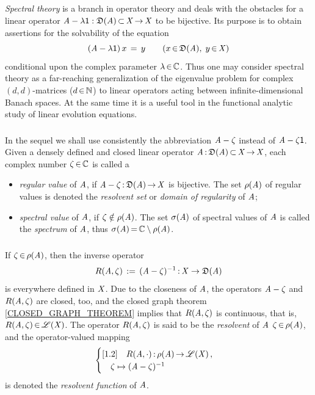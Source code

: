 \documentclass[11pt,twoside]{article}
\begin{document}
\subparagraph*{}
\textit{Spectral theory} is a branch in operator theory
and deals with the obstacles for a linear operator
$\mathit{A} - \lambda {\mathsf{1}}:\mathfrak{D}(\mathit{A}) {\,\subset\,} \mathit{X} {\,\to\,} \mathit{X}$ to be bijective.
Its purpose is to obtain assertions for the solvability of the equation
\[
(\mathit{A} - \lambda {\mathsf{1}}) \, x \,=\, y
\quad \quad (x {\,\in\,} \mathfrak{D}(\mathit{A}), \; y {\,\in\,} \mathit{X})
\]
conditional upon the complex parameter $\lambda {\,\in\,} {\mathbb{C}}$.
Thus one may consider spectral theory as a far-reaching generalization
of the eigen\-value problem for complex $(d,d)$-matrices ($d {\,\in\,} {\mathbb{N}}$)
to linear operators acting between infinite-dimensional Banach spaces.
At the same time it is a useful tool in the functional analytic study
of linear evolution equations.

\subsubsection*{} %
In the sequel we shall use consistently the abbreviation $\mathit{A} - \zeta$
instead of $\mathit{A} -\zeta {\mathsf{1}}$.
Given a densely defined and closed linear operator
$\mathit{A} {\,:\,} \mathfrak{D}(\mathit{A}) {\,\subset\,} \mathit{X} {\,\to\,} \mathit{X}$,
each complex number $\zeta {\,\in\,} {\mathbb{C}}$ is called a

\begin{itemize}[leftmargin=12pt]
\item[1.]
\textit{regular value} of $\mathit{A}$,
if $\mathit{A} - \zeta {\,:\,} \mathfrak{D}(\mathit{A}) {\,\to\,} \mathit{X}$ is bijective.
The set $\rho(\mathit{A})$ of regular values is denoted
the \textit{resolvent set} or \textit{domain of regularity} of $\mathit{A}$;

\item[2.]
\textit{spectral value} of $\mathit{A}$,
if $\zeta \notin \rho(\mathit{A})$.
The set $\sigma(\mathit{A})$ of spectral values of $\mathit{A}$ is called
the \textit{spectrum} of $\mathit{A}$,
thus $\sigma(\mathit{A}) {\,=\,} {\mathbb{C}} \setminus \rho(\mathit{A})$.
\end{itemize}

\subparagraph*{}
If $\zeta {\,\in\,} \rho(\mathit{A})$, then the inverse operator
\[
R(\mathit{A},\zeta) \,:=\, (\mathit{A} - \zeta)^{-1} {\,:\,} \mathit{X} \to \mathfrak{D}(\mathit{A})
\]
is everywhere defined in $\mathit{X}$.
Due to the closeness of $\mathit{A}$,
the operators $\mathit{A} - \zeta$ and $R(\mathit{A},\zeta)$ are closed, too,
and the {closed graph theorem} \ref{CLOSED_GRAPH_THEOREM}
implies that $R(\mathit{A},\zeta)$ is continuous,
that is,
$R(\mathit{A},\zeta) {\,\in\,} \mathscr{L}(\mathit{X})$.
The operator $R(\mathit{A},\zeta)$ is said to be the \textit{resolvent} of $\mathit{A}$
{\wrt} $\zeta {\,\in\,} \rho(\mathit{A})$,
and the operator-valued mapping
\begin{equation}\label{RESOLVENT_FUNCTION}
\begin{cases}[1.2]
\quad R(\mathit{A},\cdot) {\,:\,} \rho(\mathit{A}) {\,\to\,} \mathscr{L}(\mathit{X})\,,\\
\quad \zeta \mapsto (\mathit{A} - \zeta)^{-1}\\
\end{cases}
\end{equation}
is denoted the \textit{resolvent function} of $\mathit{A}$.
\end{document}
